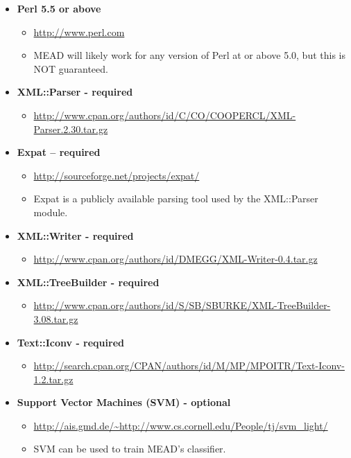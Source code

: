 \documentclass[10pt]{article}
\begin{document}
\begin{itemize}

\item {\bf Perl 5.5 or above}
\begin{itemize}
\item \url{http://www.perl.com}
\item MEAD will likely work for any version of Perl at or above
5.0, but this is NOT guaranteed.
\end{itemize}

\item {\bf XML::Parser - required}
\begin{itemize}
\item \url{http://www.cpan.org/authors/id/C/CO/COOPERCL/XML-Parser.2.30.tar.gz}
\end {itemize}

\item {\bf Expat -- required}
\begin{itemize}
\item \url{http://sourceforge.net/projects/expat/}
\item Expat is a publicly available parsing tool used by the XML::Parser 
  module.  
\end{itemize}

\item {\bf XML::Writer - required}
\begin{itemize}
\item \url{http://www.cpan.org/authors/id/DMEGG/XML-Writer-0.4.tar.gz}
\end{itemize}

\item {\bf XML::TreeBuilder - required}
\begin{itemize}
\item \url{http://www.cpan.org/authors/id/S/SB/SBURKE/XML-TreeBuilder-3.08.tar.gz}
\end {itemize}

\item {\bf Text::Iconv - required}
\begin{itemize}
\item \url{http://search.cpan.org/CPAN/authors/id/M/MP/MPOITR/Text-Iconv-1.2.tar.gz}
\end{itemize}

\item {\bf Support Vector Machines (SVM) - optional}
\begin{itemize}
\item \url{http://ais.gmd.de/\~http://www.cs.cornell.edu/People/tj/svm_light/}
\item SVM can be used to train MEAD's classifier.
\end{itemize}


\end{itemize}
\end{document}
